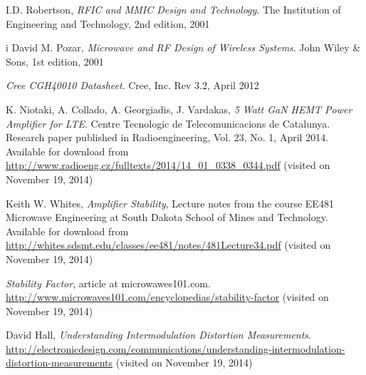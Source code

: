   \begin{thebibliography}{9}

		  I.D. Robertson, \emph{RFIC and MMIC Design and Technology}.
		  The Institution of Engineering and Technology,
		  2nd edition,
		  2001

i		  David M. Pozar, \emph{Microwave and RF Design of Wireless Systems}.
		  John Wiley \& Sons,
		  1st edition,
		  2001

		  \emph{Cree CGH40010 Datasheet}.
		  Cree, Inc. 
		  Rev 3.2,
		  April 2012

		  K. Niotaki, A. Collado, A. Georgiadis, J. Vardakas, \emph{5 Watt GaN HEMT Power Amplifier for LTE}.
		  Centre Tecnologic de Telecomunicacions de Catalunya.
		  Research paper published in Radioengineering, Vol. 23, No. 1, April 2014. Available for download from \url{http://www.radioeng.cz/fulltexts/2014/14_01_0338_0344.pdf} (visited on November 19, 2014)

		  Keith W. Whites, \emph{Amplifier Stability}, Lecture notes from the course EE481 Microwave Engineering at South Dakota School of Mines and Technology.
		  Available for download from \url{http://whites.sdsmt.edu/classes/ee481/notes/481Lecture34.pdf} (visited on November 19, 2014)

		  \emph{Stability Factor}, article at microwawes101.com. \url{http://www.microwaves101.com/encyclopedias/stability-factor} (visited on November 19, 2014)

		  David Hall, \emph{Understanding Intermodulation Distortion Measurements}. \url{http://electronicdesign.com/communications/understanding-intermodulation-distortion-measurements} (visited on November 19, 2014)

  \end{thebibliography}

